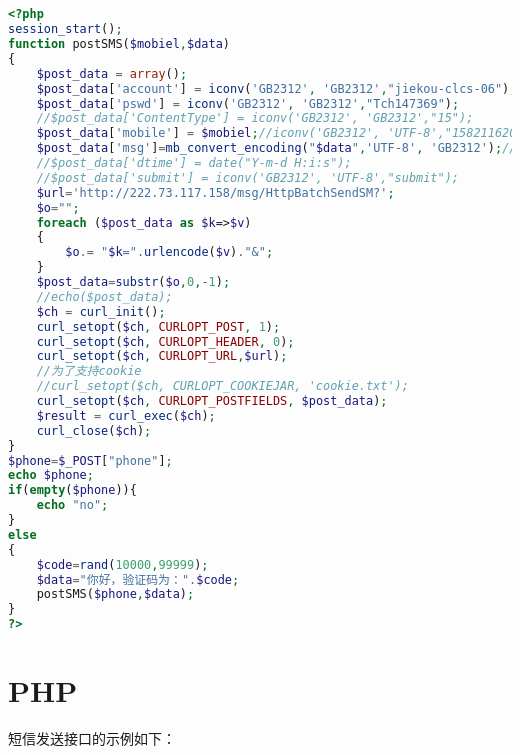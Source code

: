 \documentclass[11pt]{book} %
\begin{document}
\begin{lstlisting}[language=PHP]


<?php
session_start();
function postSMS($mobiel,$data)
{
	$post_data = array();
	$post_data['account'] = iconv('GB2312', 'GB2312',"jiekou-clcs-06");
	$post_data['pswd'] = iconv('GB2312', 'GB2312',"Tch147369");
	//$post_data['ContentType'] = iconv('GB2312', 'GB2312',"15");
	$post_data['mobile'] = $mobiel;//iconv('GB2312', 'UTF-8',"15821162098");
	$post_data['msg']=mb_convert_encoding("$data",'UTF-8', 'GB2312');//iconv('GB2312', 'UTF-8',"123456");
	//$post_data['dtime'] = date("Y-m-d H:i:s");
	//$post_data['submit'] = iconv('GB2312', 'UTF-8',"submit");
	$url='http://222.73.117.158/msg/HttpBatchSendSM?';
	$o="";
	foreach ($post_data as $k=>$v)
	{
		$o.= "$k=".urlencode($v)."&";
	}
	$post_data=substr($o,0,-1);
	//echo($post_data);
	$ch = curl_init();
	curl_setopt($ch, CURLOPT_POST, 1);
	curl_setopt($ch, CURLOPT_HEADER, 0);
	curl_setopt($ch, CURLOPT_URL,$url);
	//为了支持cookie
	//curl_setopt($ch, CURLOPT_COOKIEJAR, 'cookie.txt');
	curl_setopt($ch, CURLOPT_POSTFIELDS, $post_data);
	$result = curl_exec($ch);
	curl_close($ch);
}
$phone=$_POST["phone"];
echo $phone;
if(empty($phone)){
	echo "no";
}
else 
{
	$code=rand(10000,99999);
	$data="你好，验证码为：".$code;
	postSMS($phone,$data);
}
?>
\end{lstlisting}


\section{PHP}

短信发送接口的示例如下：
\end{document}
